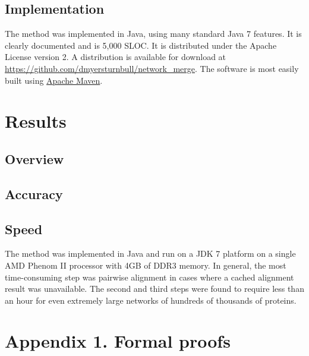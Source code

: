 \documentclass[12pt,twoside]{article}
\def\NI{\noindent}
\begin{document}
\subsection{Implementation}

\NI The method was implemented in Java, using many standard Java 7 features. It is clearly documented and is 5,000 SLOC. It is distributed under the Apache License version 2. A distribution is available for download at \url{https://github.com/dmyersturnbull/network_merge}. The software is most easily built using \href{http://maven.apache.org/}{Apache Maven}.

\section{Results}

\NI 

\subsection{Overview}

\subsection{Accuracy}

\subsection{Speed}

\NI The method was implemented in Java and run on a JDK 7 platform on a single AMD Phenom II processor with 4GB of DDR3 memory. In general, the most time-consuming step was pairwise alignment in cases where a cached alignment result was unavailable. The second and third steps were found to require less than an hour for even extremely large networks of hundreds of thousands of proteins.

\section{Appendix 1. Formal proofs}



\end{document}
